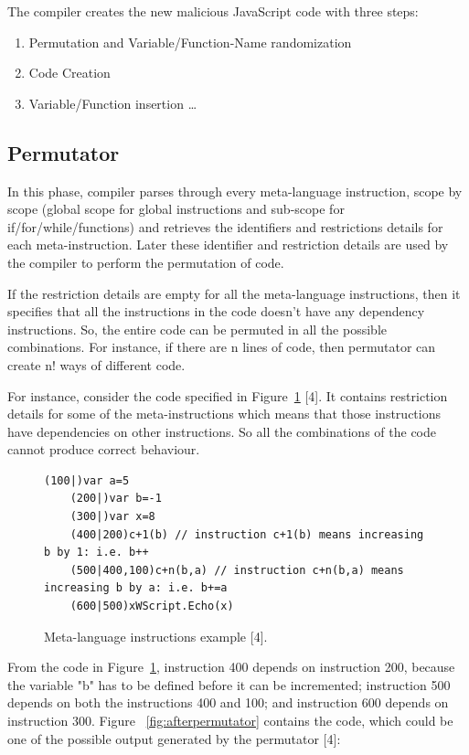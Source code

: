 The compiler creates the new malicious JavaScript code with three steps:

\begin{enumerate}
  \item Permutation and Variable/Function-Name randomization
  \item Code Creation
  \item Variable/Function insertion \ldots
\end{enumerate}

\subsection{Permutator}

In this phase, compiler parses through every meta-language instruction, scope by scope (global scope for global instructions and sub-scope for if/for/while/functions) and retrieves the identifiers and restrictions details for each meta-instruction. Later these identifier and restriction details are used by the compiler to perform the permutation of code.

If the restriction details are empty for all the meta-language instructions, then it specifies that all the instructions in the code doesn't have any dependency instructions. So, the entire code can be permuted in all the possible combinations. For instance, if there are n lines of code, then permutator can create n! ways of different code. 

For instance, consider the code specified in Figure~\ref{fig:permutator} [4]. It contains restriction details for some of the meta-instructions which means that those instructions have dependencies on other instructions. So all the combinations of the code cannot produce correct behaviour. 


\begin{figure}
  \centering
  \begin{lstlisting}[language=myasm]
	(100|)var a=5
	(200|)var b=-1
	(300|)var x=8
	(400|200)c+1(b)	// instruction c+1(b) means increasing b by 1: i.e. b++
	(500|400,100)c+n(b,a) // instruction c+n(b,a) means increasing b by a: i.e. b+=a
	(600|500)xWScript.Echo(x)
\end{lstlisting}


    \caption[Meta-language instructions example]{Meta-language instructions example [4].}
    \label{fig:permutator}
\end{figure}


From the code in Figure~\ref{fig:permutator}, instruction 400 depends on instruction 200, because the variable "b" has to be defined before it can be incremented; instruction 500 depends on both the instructions 400 and 100; and instruction 600 depends on instruction 300. Figure ~\ref{fig:afterpermutator} contains the code, which could be one of the possible output generated by the permutator [4]:

